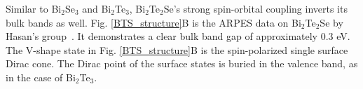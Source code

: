 Similar to Bi$_2$Se$_3$ and Bi$_2$Te$_3$, Bi$_2$Te$_2$Se's strong spin-orbital coupling inverts its bulk bands as well. Fig. \ref{BTS_structure}B is the ARPES data on Bi$_2$Te$_2$Se by Hasan's group~\cite{BTS_ARPES}. It demonstrates a clear bulk band gap of approximately 0.3 eV. The V-shape state in Fig. \ref{BTS_structure}B is the spin-polarized single surface Dirac cone. The Dirac point of the surface states is buried in the valence band, as in the case of Bi$_2$Te$_3$.